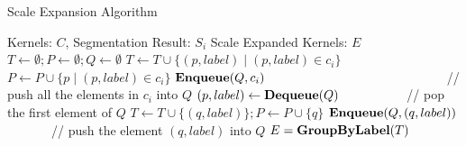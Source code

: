 \documentclass[10pt,twocolumn,letterpaper]{article}
\begin{document}
	\begin{algorithm}[t]
		\scriptsize
		\caption{Scale Expansion Algorithm}
		\begin{algorithmic}[1]
			\Require Kernels: $C$, Segmentation Result: $S_i$
			\Ensure Scale Expanded Kernels: $E$
			\State $T \gets \emptyset; P \gets \emptyset; Q \gets \emptyset$
			\State $T \gets T \cup \{(p, label) \mid (p, label) \in c_i\}$
			\State $P \gets P \cup \{p \mid (p, label) \in c_i\}$
			\State $\mbox{\bf{Enqueue}}(Q, c_i)$ \ \ \ \ \ \ \ \ \ \ \ \ \ \ \ \ \ \ \ \ \ \ \ \ \ \ \ \ // push all the elements in $c_i$ into $Q$
			\EndFor
			\State $(p, label) \gets \mbox{\bf{Dequeue}}(Q)$   \ \ \ \ \ \ \ \ \ \ // pop the first element of $Q$
			\State $T \gets T \cup \{(q, label)\}; P \gets P \cup \{q\}$
			\State $\mbox{\bf{Enqueue}}(Q, (q, label))$ \ \ \ \ \ \ \ // push the element $(q, label)$ into $Q$
			\EndIf
			\EndWhile
			\State $E = \mbox{\bf{GroupByLabel}}(T)$
			\State {}
			\EndFunction
		\end{algorithmic}
		\label{alg:expansion}
	\end{algorithm}
	
\end{document}
